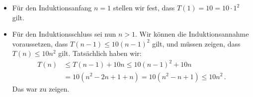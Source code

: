 \documentclass[a4paper,11pt,oneside]{scrartcl}
\begin{document}
\begin{itemize}
  \item Für den Induktionsanfang $n=1$ stellen wir fest, dass $T(1)=10=10 \cdot 1^2$ gilt.
  \item Für den Induktionsschluss sei nun $n>1$. Wir können die Induktionsannahme voraussetzen, dass $T(n-1)\le 10 (n-1)^2$ gilt, und müssen zeigen, dass $T(n)\le 10n^2$ gilt. Tatsächlich haben wir:
  \begin{align*}
    T(n) &\le T(n-1)+10n
    \le 10(n-1)^2 + 10n\\
    &= 10 (n^2-2n+1+n)
    = 10 (n^2-n+1) \le 10 n^2\,.
  \end{align*}
  Das war zu zeigen.
\end{itemize}



\end{document}
